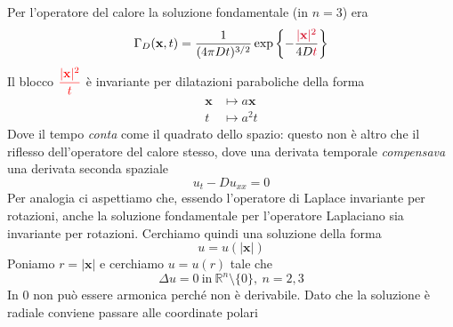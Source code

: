 \documentclass[10pt,a4paper,twoside,openright]{book}
\newcommand{\x}{\mathbf{x}}
\begin{document}
Per l'operatore del calore la soluzione fondamentale (in $n=3$) era
\begin{equation*}
	\Gamma _{D}(\x,t) =\frac{1}{(4\pi Dt)^{3/2}}\exp\left\{-\frac{\textcolor[rgb]{0.82,0.01,0.11}{|\x|^{2}}}{4D\textcolor[rgb]{0.82,0.01,0.11}{t}}\right\}
\end{equation*}
Il blocco $\displaystyle \textcolor[rgb]{1,0,0}{\frac{|\x|^{2}}{t}}$ è invariante per dilatazioni paraboliche della forma
\begin{align*}
	\x & \longmapsto a\x      \\
	t & \longmapsto a^{2} t 
\end{align*}
Dove il tempo \textit{conta} come il quadrato dello spazio: questo non è altro che il riflesso dell'operatore del calore stesso, dove una derivata temporale \textit{compensava} una derivata seconda spaziale	
\begin{equation*}
	u_{t} -Du_{xx} =0
\end{equation*}
Per analogia ci aspettiamo che, essendo l'operatore di Laplace invariante per rotazioni, anche la soluzione fondamentale per l'operatore Laplaciano sia invariante per rotazioni. Cerchiamo quindi una soluzione della forma
\begin{equation*}
	u=u(|\x|)
\end{equation*}
Poniamo $\displaystyle r=|\x| $ e cerchiamo $\displaystyle u=u(r)$ tale che
\begin{equation*}
	\Delta u=0\ \text{in} \ \mathbb{R}^{n} \setminus \{0\},\ n=2,3
\end{equation*}
In $0$ non può essere armonica perché non è derivabile. Dato che la soluzione è radiale conviene passare alle coordinate polari
\end{document}

